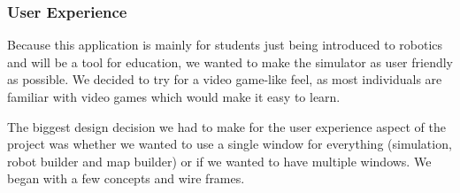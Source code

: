  \subsubsection*{User Experience}
	Because this application is mainly for students just being introduced to robotics and will be a tool for education, we wanted to make the simulator as user friendly as possible. We decided to try for a video game-like feel, as most individuals are familiar with video games which would make it easy to learn. 
	
	The biggest design decision we had to make for the user experience aspect of the project was whether we wanted to use a single window for everything (simulation, robot builder and map builder) or if we wanted to have multiple windows. We began with a few concepts and wire frames. 

